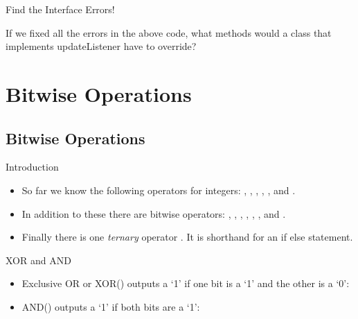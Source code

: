 \begin{frame}[fragile]{Find the Interface Errors!}
\begin{semiverbatim}\end{semiverbatim}\pause

\begin{center}If we fixed all the errors in the above code, what methods would a class that implements updateListener have to override?\end{center}
\end{frame}

\section{Bitwise Operations}
\subsection{Bitwise Operations}
\begin{frame}{Introduction}
\begin{itemize}
\item So far we know the following operators for integers: \code{\texttt{+}}, \code{\texttt{-}}, \code{\texttt{\textsuperscript{*}}}, \code{\texttt{/}}, \code{\texttt{\%}}, and \code{\texttt{=}}.
\item In addition to these there are bitwise operators: \code{\texttt{\^}}, \code{\texttt{\&}}, \code{\texttt{|}}, \code{\texttt{\textasciitilde}}, \code{\texttt{>>}}, \code{\texttt{>>>}}, and \code{\texttt{<<}}.
\item Finally there is one \emph{ternary} operator . It is shorthand for an if else statement.
\end{itemize}
\end{frame}

\begin{frame}[fragile]{XOR and AND}
\begin{itemize}
\item Exclusive OR or XOR(\code{\texttt{\^}}) outputs a `1' if one bit is a `1' and the other is a `0':

\begin{semiverbatim}\end{semiverbatim}
\pause
\item AND(\code{\texttt{\&}}) outputs a `1' if both bits are a `1':

\begin{semiverbatim}\end{semiverbatim}
\end{itemize}
\end{frame}


